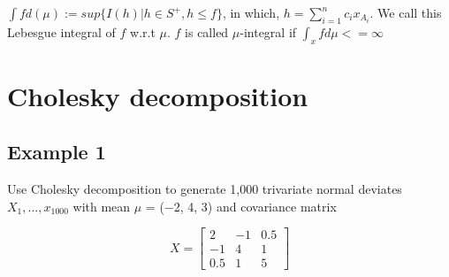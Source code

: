 \documentclass[
]{book}
\begin{document}
\(\int f d(\mu):=sup \{ I(h) | h \in S^+, h \leq f \}\), in which, \(h = \sum_{i=1}^n c_i x_{A_i}\). We call this Lebesgue integral of \(f\) w.r.t \(\mu\). \(f\) is called \(\mu\)-integral if \(\int_x f d\mu < =\infty\)

\hypertarget{cholesky-decomposition}{%
\chapter{Cholesky decomposition}\label{cholesky-decomposition}}

\hypertarget{example-1}{%
\section{Example 1}\label{example-1}}

Use Cholesky decomposition to generate 1,000 trivariate normal deviates \(X_1, ..., x_{1000}\) with mean \(\mu\) = (−2, 4, 3) and covariance matrix

\[X=\begin{bmatrix}
2 & -1 & 0.5 \\
-1 & 4 & 1 \\
0.5 & 1 & 5 
\end{bmatrix}\]
\end{document}

